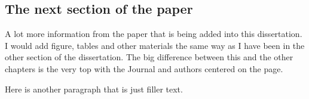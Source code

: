 \subsection{The next section of the paper}
A lot more information from the paper that is being added into this dissertation. I would add figure, tables and other materials the same way as I have been in the other section of the dissertation. The big difference between this and the other chapters is the very top with the Journal and authors centered on the page.

Here is another paragraph that is just filler text. \lipsum[1]